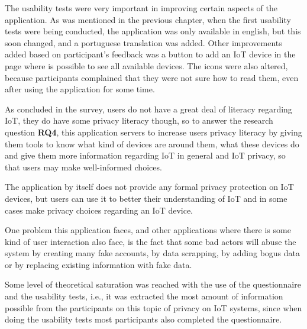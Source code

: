 The usability tests were very important in improving certain aspects of the
application. As was mentioned in the previous chapter, when the first
usability tests were being conducted, the application was only available
in english, but this soon changed, and a portuguese translation was added.
Other improvements added based on participant's feedback was a button
to add an IoT device in the page where is possible to see all available
devices. The icons were also altered, because participants complained that
they were not sure how to read them, even after using the application for some time.

As concluded in the survey, users do not have a great deal of literacy
regarding IoT, they do have some privacy literacy though, so
to answer the research question \textbf{RQ4}, this application servers to increase users
privacy literacy by giving them tools to know what kind of devices
are around them, what these devices do and give them more information
regarding IoT in general and IoT privacy, so that users may make
well-informed choices.

The application by itself does not provide any formal privacy protection
on IoT devices, but users can use it to better their understanding of IoT
and in some cases make privacy choices regarding an IoT device.

One problem this application faces, and other applications where there is
some kind of user interaction also face, is the fact that some bad
actors will abuse the system by creating many fake accounts, by
data scrapping, by adding bogus data or by replacing existing information
with fake data.

Some level of theoretical saturation \cite{low2019pragmatic} was reached with the use of the questionnaire
and the usability tests, i.e., it was extracted the most amount of information
possible from the participants on this topic of privacy on IoT systems, since
when doing the usability tests most participants also completed the questionnaire.

